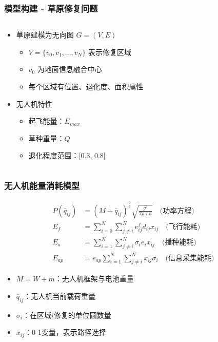 \documentclass[9pt, aspectratio=169]{beamer}  %
\begin{document}
\begin{frame}
	\frametitle{模型构建 - 草原修复问题}
	\begin{columns}
		\begin{column}{0.5\textwidth}
			\begin{itemize}
				\item 草原建模为无向图 $G = (V, E)$
				      \begin{itemize}
					      \item $V = \{v_0, v_1, ..., v_N \}$ 表示修复区域
					      \item $v_0$ 为地面信息融合中心
					      \item 每个区域有位置、退化度、面积属性
				      \end{itemize}
				\item 无人机特性
				      \begin{itemize}
					      \item 起飞能量：$E_{max}$
					      \item 草种重量：$Q$
					      \item 退化程度范围：[0.3, 0.8]
				      \end{itemize}
			\end{itemize}
		\end{column}
		\begin{column}{0.5\textwidth}
			\centering
			
		\end{column}
	\end{columns}
\end{frame}

\begin{frame}
	\frametitle{无人机能量消耗模型}
	\begin{align*}
		P(\bar{q}_{ij}) & = (M + \bar{q}_{ij})^{\frac{3}{2}}\sqrt{\frac{g^3}{2 \rho \varsigma h}} \quad \text{(功率方程)} \\
		E_f             & = \sum^N_{i=0}\sum^N_{j \neq i} e^f_{ij} d_{ij} x_{ij} \quad \text{(飞行能耗)}                  \\
		E_s             & = \sum^N_{i = 1}\sum^N_{j \neq i}\sigma_i e_i x_{ij} \quad \text{(播种能耗)}                    \\
		E_{ap}          & = e_{ap}\sum^N_{i=1}\sum^N_{j \neq i} x_{ij}\sigma_i \quad \text{(信息采集能耗)}
	\end{align*}
	\begin{itemize}
		\item $M = W + m$：无人机框架与电池重量
		\item $\bar{q}_{ij}$：无人机当前载荷重量
		\item $\sigma_i$：在区域$i$修复的单位圆数量
		\item $x_{ij}$：0-1变量，表示路径选择
	\end{itemize}
\end{frame}
\end{document}
